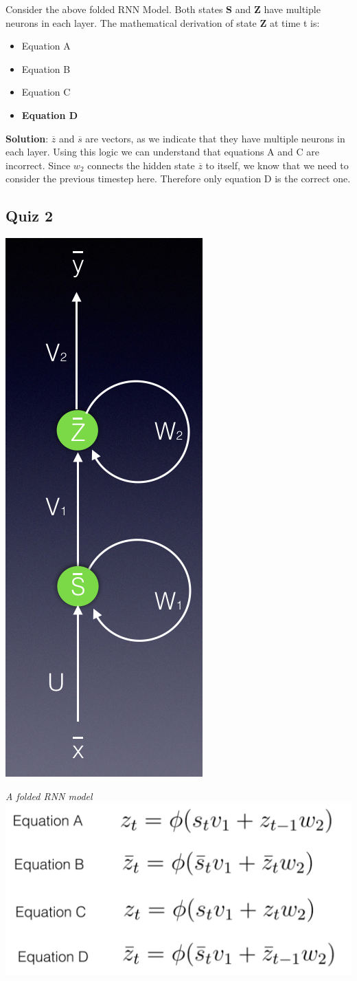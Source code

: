 Consider the above folded RNN Model. Both states \textbf{S} and \textbf{Z} have multiple neurons in each layer. The mathematical derivation of state \textbf{Z} at time t is:
\begin{itemize}
    \item Equation A
    \item Equation B
    \item Equation C
    \item \textbf{Equation D}
\end{itemize}
\textbf{Solution}: \(\overline{z}\) and \(\overline{s}\) are vectors, as we indicate that they have multiple neurons in each layer. Using this logic we can understand that equations A and C are incorrect. Since \(w_2\) connects the hidden state \(\overline{z}\) to itself, we know that we need to consider the previous timestep here. Therefore only equation D is the correct one.

\subsection{Quiz 2}
\includegraphics[width=0.25\linewidth]{img//rnn//intro/screen-shot-2017-11-29-at-3.08.28-pm.png}

\textit{A folded RNN model} \newline
\includegraphics[width=0.5\linewidth]{img//rnn//intro/screen-shot-2017-11-29-at-5.33.53-pm.png}

